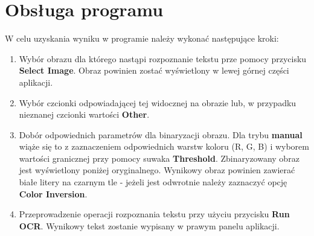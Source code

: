 \section{Obsługa programu}
	W celu uzyskania wyniku w programie należy wykonać następujące kroki:
	\begin{enumerate}
		\item Wybór obrazu dla którego nastąpi rozpoznanie tekstu prze pomocy przycisku \textbf{Select Image}. Obraz powinien zostać wyświetlony w lewej górnej części aplikacji.
		\item Wybór czcionki odpowiadającej tej widocznej na obrazie lub, w przypadku nieznanej czcionki wartości \textbf{Other}.
		\item Dobór odpowiednich parametrów dla binaryzacji obrazu. 
			Dla trybu \textbf{manual} wiąże się to z zaznaczeniem odpowiednich warstw koloru (R, G, B) i wyborem wartości granicznej przy pomocy suwaka \textbf{Threshold}.
			Zbinaryzowany obraz jest wyświetlony poniżej oryginalnego.			
			Wynikowy obraz powinien zawierać białe litery na czarnym tle - jeżeli jest odwrotnie należy zaznaczyć opcję \textbf{Color Inversion}.
		\item Przeprowadzenie operacji rozpoznania tekstu przy użyciu przycisku \textbf{Run OCR}. Wynikowy tekst zostanie wypisany w prawym panelu aplikacji.
	\end{enumerate}